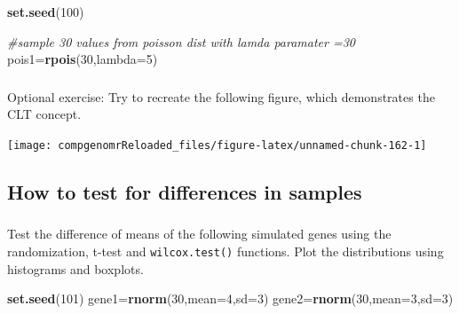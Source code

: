 \documentclass[12pt,]{krantz}
\newenvironment{Shaded}{\begin{snugshade}}{\end{snugshade}}
\newcommand{\CommentTok}[1]{\textcolor[rgb]{0.56,0.35,0.01}{\textit{#1}}}
\newcommand{\DataTypeTok}[1]{\textcolor[rgb]{0.13,0.29,0.53}{#1}}
\newcommand{\DecValTok}[1]{\textcolor[rgb]{0.00,0.00,0.81}{#1}}
\newcommand{\KeywordTok}[1]{\textcolor[rgb]{0.13,0.29,0.53}{\textbf{#1}}}
\newcommand{\NormalTok}[1]{#1}
\theoremstyle{definition}
\theoremstyle{definition}
\theoremstyle{definition}
\theoremstyle{remark}
\begin{document}
\begin{Shaded}
\begin{Highlighting}[]
\KeywordTok{set.seed}\NormalTok{(}\DecValTok{100}\NormalTok{)}

\CommentTok{#sample 30 values from poisson dist with lamda paramater =30}
\NormalTok{pois1=}\KeywordTok{rpois}\NormalTok{(}\DecValTok{30}\NormalTok{,}\DataTypeTok{lambda=}\DecValTok{5}\NormalTok{)}
\end{Highlighting}
\end{Shaded}

\hypertarget{section-3}{%
\subsubsection{}\label{section-3}}

Optional exercise: Try to recreate the following figure, which
demonstrates the CLT concept.

\begin{center}\texttt{[image: compgenomrReloaded\_files/figure-latex/unnamed-chunk-162-1]} \end{center}

\hypertarget{how-to-test-for-differences-in-samples}{%
\subsection{How to test for differences in
samples}\label{how-to-test-for-differences-in-samples}}

\hypertarget{section-4}{%
\subsubsection{}\label{section-4}}

Test the difference of means of the following simulated genes using the
randomization, t-test and \texttt{wilcox.test()} functions. Plot the
distributions using histograms and boxplots.

\begin{Shaded}
\begin{Highlighting}[]
\KeywordTok{set.seed}\NormalTok{(}\DecValTok{101}\NormalTok{)}
\NormalTok{gene1=}\KeywordTok{rnorm}\NormalTok{(}\DecValTok{30}\NormalTok{,}\DataTypeTok{mean=}\DecValTok{4}\NormalTok{,}\DataTypeTok{sd=}\DecValTok{3}\NormalTok{)}
\NormalTok{gene2=}\KeywordTok{rnorm}\NormalTok{(}\DecValTok{30}\NormalTok{,}\DataTypeTok{mean=}\DecValTok{3}\NormalTok{,}\DataTypeTok{sd=}\DecValTok{3}\NormalTok{)}
\end{Highlighting}
\end{Shaded}
\end{document}
